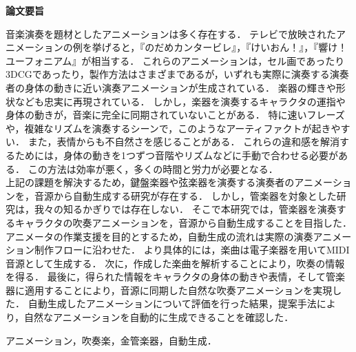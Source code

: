 \begin{center}
{\bf {\large 論文要旨}}
\end{center}

\vspace{3ex}
音楽演奏を題材としたアニメーションは多く存在する．
テレビで放映されたアニメーションの例を挙げると，『のだめカンタービレ』，『けいおん！』，『響け！ユーフォニアム』が相当する．
これらのアニメーションは，セル画であったり3DCGであったり，製作方法はさまざまであるが，いずれも実際に演奏する演奏者の身体の動きに近い演奏アニメーションが生成されている．
楽器の輝きや形状なども忠実に再現されている．
%
しかし，楽器を演奏するキャラクタの運指や身体の動きが，音楽に完全に同期されていないことがある．
特に速いフレーズや，複雑なリズムを演奏するシーンで，このようなアーティファクトが起きやすい．
また，表情からも不自然さを感じることがある．
これらの違和感を解消するためには，身体の動きを1つずつ音階やリズムなどに手動で合わせる必要がある．
この方法は効率が悪く，多くの時間と労力が必要となる．\\
%
\indent
上記の課題を解決するため，鍵盤楽器や弦楽器を演奏する演奏者のアニメーションを，音源から自動生成する研究が存在する．
しかし，管楽器を対象とした研究は，我々の知るかぎりでは存在しない．
そこで本研究では，管楽器を演奏するキャラクタの吹奏アニメーションを，音源から自動生成することを目指した．
アニメータの作業支援を目的とするため，自動生成の流れは実際の演奏アニメーション制作フローに沿わせた．
より具体的には，楽曲は電子楽器を用いてMIDI音源として生成する．
次に，作成した楽曲を解析することにより，吹奏の情報を得る．
最後に，得られた情報をキャラクタの身体の動きや表情，そして管楽器に適用することにより，音源に同期した自然な吹奏アニメーションを実現した．
自動生成したアニメーションについて評価を行った結果，提案手法により，自然なアニメーションを自動的に生成できることを確認した．

\vspace{4ex}

\noindent
{}

\noindent
アニメーション，吹奏楽，金管楽器，自動生成．
